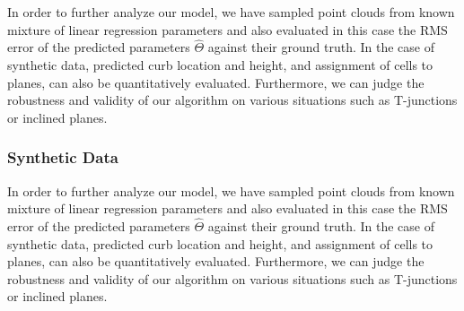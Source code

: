 In order to further analyze our model, we have sampled point clouds from known
mixture of linear regression parameters and also evaluated in this case the RMS
error of the predicted parameters $\hat{\Theta}$ against their ground truth. In
the case of synthetic data, predicted curb location and height, and assignment
of cells to planes, can also be quantitatively evaluated. Furthermore, we can
judge the robustness and validity of our algorithm on various situations such
as T-junctions or inclined planes.

\subsubsection{Synthetic Data}

In order to further analyze our model, we have sampled point clouds from known
mixture of linear regression parameters and also evaluated in this case the RMS
error of the predicted parameters $\hat{\Theta}$ against their ground truth. In
the case of synthetic data, predicted curb location and height, and assignment
of cells to planes, can also be quantitatively evaluated. Furthermore, we can
judge the robustness and validity of our algorithm on various situations such
as T-junctions or inclined planes.
